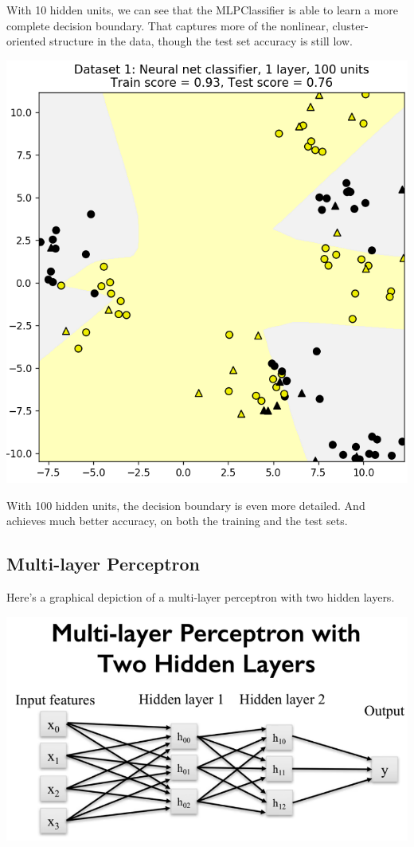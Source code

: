 \begin{multicols}{2}
With 10 hidden units, we can see that the MLPClassifier is able to learn a more complete decision boundary. That captures more of the nonlinear, cluster-oriented structure in the data, though the test set accuracy is still low. 

\begin{center}
	\includegraphics[width=\linewidth]{img/Neural-net-classifier-1layer-100units.png} 
\end{center}

With 100 hidden units, the decision boundary is even more detailed. And achieves much better accuracy, on both the training and the test sets. 

\subsection{Multi-layer Perceptron}

Here's a graphical depiction of a multi-layer perceptron with two hidden layers. 

\begin{center}
	\includegraphics[width=\linewidth]{img/Multi-layer-Perseptron-2Hidden-layers.png} 
\end{center}


\end{multicols}
